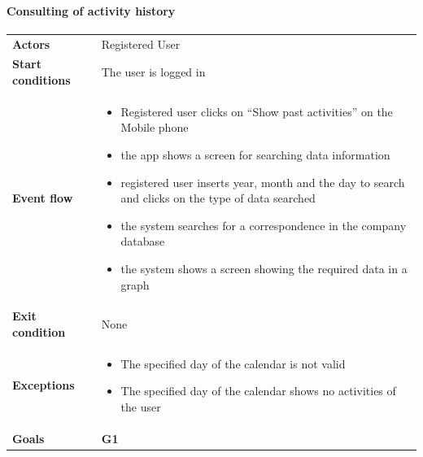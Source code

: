 \paragraph{Consulting of activity history}
\begin{center}
\begin{table}[H]
\centering
\begin{tabular}{l|p{}}
\textbf{Actors} & Registered User \\
\textbf{Start conditions} & The user is logged in \\
\textbf{Event flow}  & \begin{minipage}[t]{0.7\textwidth}
    \begin{itemize}
        \item Registered user clicks on “Show past activities” on the Mobile phone
        \item the app shows a screen for searching data information
        \item registered user inserts year, month and the day to search and clicks on the type of data searched
        \item  the system searches for a correspondence in the company database
        \item the system shows a screen showing the required data in a graph
    \end{itemize}
    
\end{minipage}\\ 
    
\textbf{Exit condition} & None \\
\textbf{Exceptions} &  \begin{minipage}[t]{0.7\textwidth}
    \begin{itemize}
        \item The specified day of the calendar is not valid

        \item The specified day of the calendar shows no activities of the user
    \end{itemize}
    
\end{minipage} \\
\textbf{Goals} & \textbf{G1}
\end{tabular}

\end{table}
\end{center}

